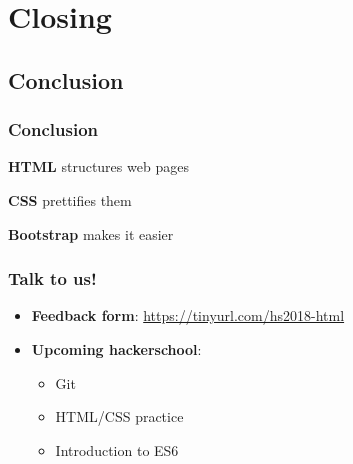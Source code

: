 \documentclass[12pt]{beamer}
\begin{document}
\section{Closing}
\subsection{Conclusion}
\begin{frame}
\frametitle{Conclusion}
\begin{center}
	\textbf{HTML} structures web pages
	
	\textbf{CSS} prettifies them
	
	\textbf{Bootstrap} makes it easier
\end{center}
\end{frame}

\begin{frame}
\frametitle{Talk to us!}
\begin{itemize}
	\item \textbf{Feedback form}: \url{https://tinyurl.com/hs2018-html}
	\item \textbf{Upcoming hackerschool}:
	\begin{itemize}
		\item Git
		\item HTML/CSS practice
		\item Introduction to ES6
	\end{itemize}
\end{itemize}
\end{frame}
\end{document}
